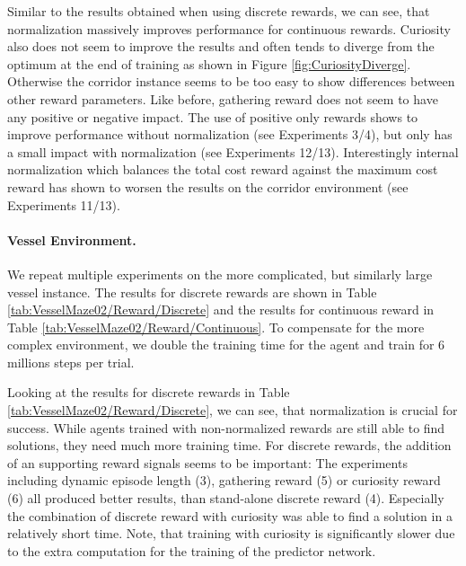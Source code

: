 Similar to the results obtained when using discrete rewards, we can see, that normalization massively improves performance for continuous rewards. Curiosity also does not seem to improve the results and often tends to diverge from the optimum at the end of training as shown in Figure \ref{fig:CuriosityDiverge}. Otherwise the corridor instance seems to be too easy to show differences between other reward parameters. Like before, gathering reward does not seem to have any positive or negative impact. The use of positive only rewards shows to improve performance without normalization (see Experiments 3/4), but only has a small impact with normalization (see Experiments 12/13). Interestingly internal normalization which balances the total cost reward against the maximum cost reward has shown to worsen the results on the corridor environment (see Experiments 11/13). 


\paragraph{Vessel Environment.} We repeat multiple experiments on the more complicated, but similarly large vessel instance. The results for discrete rewards are shown in Table \ref{tab:VesselMaze02/Reward/Discrete} and the results for continuous reward in Table \ref{tab:VesselMaze02/Reward/Continuous}. To compensate for the more complex environment, we double the training time for the agent and train for 6 millions steps per trial. 

Looking at the results for discrete rewards in Table \ref{tab:VesselMaze02/Reward/Discrete}, we can see, that normalization is crucial for success. While agents trained with non-normalized rewards are still able to find solutions, they need much more training time. For discrete rewards, the addition of an supporting reward signals seems to be important: The experiments including dynamic episode length (3), gathering reward (5) or curiosity reward (6) all produced better results, than stand-alone discrete reward (4). Especially the combination of discrete reward with curiosity was able to find a solution in a relatively short time. Note, that training with curiosity is significantly slower due to the extra computation for the training of the predictor network. 


